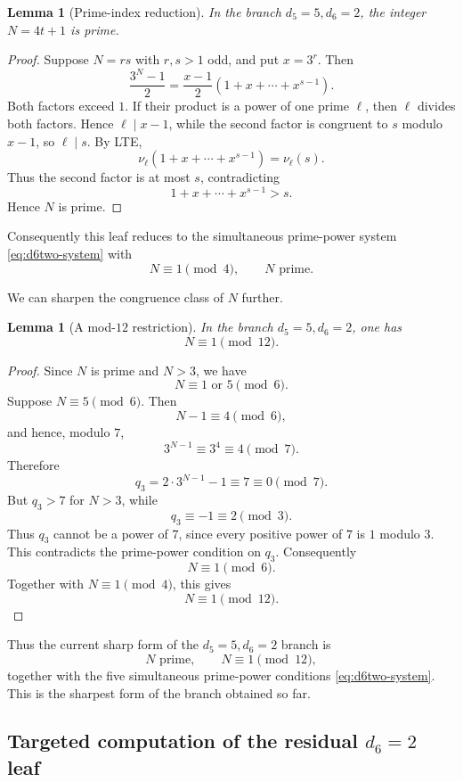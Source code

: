 \documentclass[11pt]{article}
\newtheorem{lemma}[theorem]{Lemma}
\begin{document}
\begin{lemma}[Prime-index reduction]
\label{lem:Nprime}
In the branch $d_5=5,d_6=2$, the integer $N=4t+1$ is prime.
\end{lemma}

\begin{proof}
Suppose $N=rs$ with $r,s>1$ odd, and put $x=3^r$.  Then
\[
\frac{3^N-1}{2}
=\frac{x-1}{2}(1+x+\cdots+x^{s-1}).
\]
Both factors exceed $1$.  If their product is a power of one prime $\ell$,
then $\ell$ divides both factors.  Hence $\ell\mid x-1$, while the second
factor is congruent to $s$ modulo $x-1$, so $\ell\mid s$.  By LTE,
\[
\nu_\ell(1+x+\cdots+x^{s-1})=\nu_\ell(s).
\]
Thus the second factor is at most $s$, contradicting
\[
1+x+\cdots+x^{s-1}>s.
\]
Hence $N$ is prime.
\end{proof}

Consequently this leaf reduces to the simultaneous prime-power system
\eqref{eq:d6two-system} with
\[
\boxed{N\equiv1\pmod4,\qquad N\text{ prime}.}
\]

We can sharpen the congruence class of $N$ further.

\begin{lemma}[A mod-$12$ restriction]
\label{lem:Nmod12}
In the branch $d_5=5,d_6=2$, one has
\[
\boxed{N\equiv1\pmod{12}.}
\]
\end{lemma}

\begin{proof}
Since $N$ is prime and $N>3$, we have
\[
N\equiv1\text{ or }5\pmod6.
\]
Suppose $N\equiv5\pmod6$.  Then
\[
N-1\equiv4\pmod6,
\]
and hence, modulo $7$,
\[
3^{N-1}\equiv3^4\equiv4\pmod7.
\]
Therefore
\[
q_3=2\cdot3^{N-1}-1\equiv7\equiv0\pmod7.
\]
But $q_3>7$ for $N>3$, while
\[
q_3\equiv-1\equiv2\pmod3.
\]
Thus $q_3$ cannot be a power of $7$, since every positive power of $7$ is
$1$ modulo $3$.  This contradicts the prime-power condition on $q_3$.
Consequently
\[
N\equiv1\pmod6.
\]
Together with $N\equiv1\pmod4$, this gives
\[
N\equiv1\pmod{12}.
\]
\end{proof}

Thus the current sharp form of the $d_5=5,d_6=2$ branch is
\[
\boxed{
N\text{ prime},\qquad N\equiv1\pmod{12},
}
\]
together with the five simultaneous prime-power conditions
\eqref{eq:d6two-system}.
This is the sharpest form of the branch obtained so far.

\subsection{Targeted computation of the residual $d_6=2$ leaf}
\end{document}
